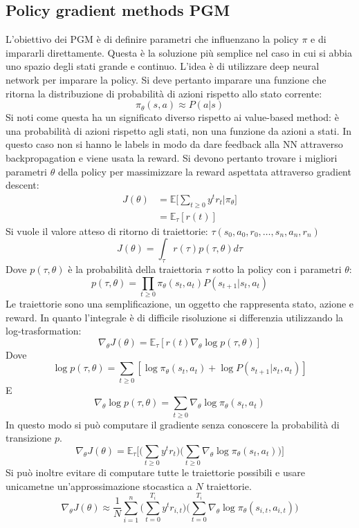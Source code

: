 \subsection{Policy gradient methods PGM}
L'obiettivo dei PGM \`e di definire parametri che influenzano la policy $\pi$ e di impararli direttamente.
Questa \`e la soluzione pi\`u semplice nel caso in cui si abbia uno spazio degli stati grande e continuo.
L'idea \`e di utilizzare deep neural network per imparare la policy.
Si deve pertanto imparare una funzione che ritorna la distribuzione di probabilit\`a di azioni rispetto allo stato corrente:
$$\pi_\theta(s,a)\approx P(a|s)$$
Si noti come questa ha un significato diverso rispetto ai value-based method: \`e una probabilit\`a di azioni rispetto agli stati, non una funzione da azioni a stati.
In questo caso non si hanno le labels in modo da dare feedback alla NN attraverso backpropagation e viene usata la reward.
Si devono pertanto trovare i migliori parametri $\theta$ della policy per massimizzare la reward aspettata attraverso gradient descent:
\begin{align*}
	J(\theta) &= \mathbb{E}\biggl[\sum\limits_{t\ge 0}y^tr_t|\pi_\theta\biggr]\\
	&=\mathbb{E}_\tau[r(t)]
\end{align*}
Si vuole il valore atteso di ritorno di traiettorie: $\tau(s_0,a_0,r_0, \dots, s_n,a_n,r_n)$
$$J(\theta) = \int_\tau r(\tau)p(\tau,\theta)d\tau$$
Dove $p(\tau,\theta)$ \`e la probabilit\`a della traiettoria $\tau$ sotto la policy con i parametri $\theta$:
$$p(\tau,\theta) = \prod\limits_{t\ge 0}\pi_\theta(s_t,a_t)P(s_{t+1}|s_t,a_t)$$
Le traiettorie sono una semplificazione, un oggetto che rappresenta stato, azione e reward.
In quanto l'integrale \`e di difficile risoluzione si differenzia utilizzando la log-trasformation:
$$\nabla_\theta J(\theta) =\mathbb{E}_\tau[r(t)\nabla_\theta\log p(\tau,\theta)]$$
Dove
$$\log p(\tau,\theta) = \sum\limits_{t\ge 0} [\log \pi_\theta(s_t,a_t) + \log P(s_{t+1}|s_t,a_t)]$$
E
$$\nabla_\theta \log p(\tau,\theta) = \sum\limits_{t\ge 0}\nabla_\theta \log\pi_\theta(s_t,a_t)$$
In questo modo si pu\`o computare il gradiente senza conoscere la probabilit\`a di transizione $p$.
$$\nabla_\theta J(\theta) = \mathbb{E}_\tau\biggl[\biggl(\sum\limits_{t\ge 0}y^tr_t\biggr)\biggl(\sum\limits_{t\ge 0}\nabla_\theta\log\pi_\theta(s_t,a_t)\biggr)\biggr]$$
Si pu\`o inoltre evitare di computare tutte le traiettorie possibili e usare unicametne un'approssimazione stocastica a $N$ traiettorie.
$$\nabla_\theta J(\theta) \approx \dfrac{1}{N}\sum\limits_{i=1}^n\biggl(\sum\limits_{t = 0}^{T_i}y^tr_{i,t}\biggr)\biggl(\sum\limits_{t= 0}^{T_i}\nabla_\theta\log\pi_\theta(s_{i,t},a_{i,t})\biggr)$$

